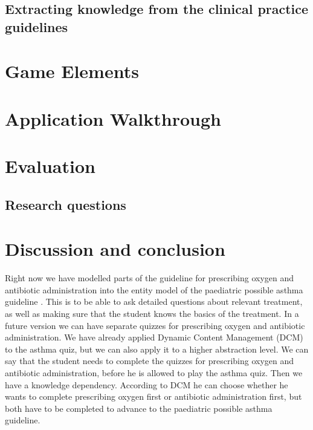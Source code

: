 \documentclass[a4paper,12pt,oneside]{book}
\begin{document}
\section{Extracting knowledge from the clinical  practice guidelines}



\chapter{Game Elements}


\chapter{Application Walkthrough}




\chapter{Evaluation}
\section{Research questions}




\chapter{Discussion and conclusion}
Right now we have modelled parts of the guideline for prescribing oxygen \parencite{RepublicofKeny2016} and antibiotic administration \parencite{RepublicofKeny2016} into the entity model of the paediatric possible asthma guideline \parencite{RepublicofKeny2016}. This is to be able to ask detailed questions about relevant treatment, as well as making sure that the student knows the basics of the treatment. In a future version we can have separate quizzes for prescribing oxygen and antibiotic administration. We have already applied Dynamic Content Management (DCM) to the asthma quiz, but we can also apply it to a higher abstraction level. We can say that the student needs to complete the quizzes for prescribing oxygen and antibiotic administration, before he is allowed to play the asthma quiz. Then we have a knowledge dependency. According to DCM he can choose whether he wants to complete prescribing oxygen first or antibiotic administration first, but both have to be completed to advance to the paediatric possible asthma guideline.
\end{document}
